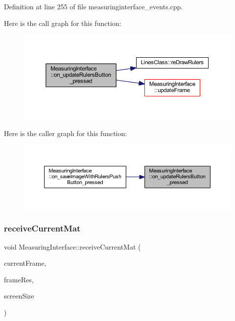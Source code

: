 Definition at line 255 of file measuringinterface\+\_\+events.\+cpp.

Here is the call graph for this function\+:
\nopagebreak
\begin{figure}[H]
\begin{center}
\leavevmode
\includegraphics[width=350pt]{class_measuring_interface_a18a63bf732f8df1ed9b94450b19ef455_cgraph}
\end{center}
\end{figure}
Here is the caller graph for this function\+:
\nopagebreak
\begin{figure}[H]
\begin{center}
\leavevmode
\includegraphics[width=350pt]{class_measuring_interface_a18a63bf732f8df1ed9b94450b19ef455_icgraph}
\end{center}
\end{figure}
\mbox{\label{class_measuring_interface_a776a6aa345a738ee46e84c272fd35ce7}} 
\subsubsection{\texorpdfstring{receiveCurrentMat}{receiveCurrentMat}}
{\footnotesize\ttfamily void Measuring\+Interface\+::receive\+Current\+Mat (\begin{DoxyParamCaption}\item[{Mat}]{current\+Frame,  }\item[{Q\+Size}]{frame\+Res,  }\item[{Q\+Rect}]{screen\+Size }\end{DoxyParamCaption})\hspace{0.3cm}{\ttfamily [slot]}}



